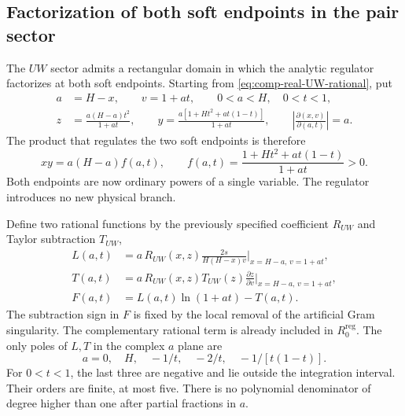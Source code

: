 \subsection{Factorization of both soft endpoints in the pair sector}
The $UW$ sector admits a rectangular domain in which the analytic
regulator factorizes at both soft endpoints. Starting from
\eqref{eq:comp-real-UW-rational}, put
\begin{align}
 a&=H-x,\qquad v=1+at,\qquad0<a<H,\quad0<t<1,\\
 z&=\frac{a(H-a)t^2}{1+at},\qquad
 y=\frac{a[1+Ht^2+at(1-t)]}{1+at},\qquad
 \left|\frac{\partial(x,v)}{\partial(a,t)}\right|=a.
\end{align}
The product that regulates the two soft endpoints is therefore
\begin{equation}
 xy=a(H-a)f(a,t),\qquad
 f(a,t)=\frac{1+Ht^2+at(1-t)}{1+at}>0.
 \label{eq:comp-real-UW-reg-factor}
\end{equation}
Both endpoints are now ordinary powers of a single variable.
The regulator introduces no new physical branch.

Define two rational functions by the previously specified
coefficient $R_{UW}$ and Taylor subtraction $T_{UW}$,
\begin{align}
 L(a,t)&=a\,R_{UW}(x,z)\frac{2s}{H(H-x)v}
                  \bigg|_{x=H-a,\,v=1+at},\\
 T(a,t)&=a\,R_{UW}(x,z)T_{UW}(z)
                   \frac{\partial z}{\partial v}
                  \bigg|_{x=H-a,\,v=1+at},\\
 F(a,t)&=L(a,t)\ln(1+at)-T(a,t).
\end{align}
The subtraction sign in $F$ is fixed by the local removal of the
artificial Gram singularity. The complementary rational term is
already included in $R_0^{\mathrm{reg}}$.
The only poles of $L,T$ in the complex $a$ plane are
\begin{equation}
 a=0,\quad H,\quad-1/t,\quad-2/t,\quad-1/[t(1-t)].
\end{equation}
For $0<t<1$, the last three are negative and lie outside the
integration interval. Their orders are finite, at most five.
There is no polynomial denominator of degree higher than one
after partial fractions in $a$.

